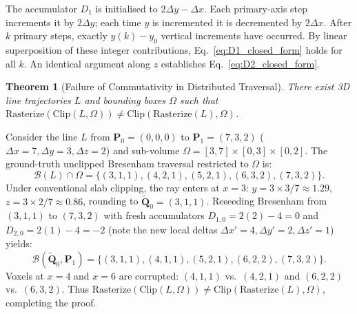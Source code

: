 \documentclass[conference]{IEEEtran}
\newtheorem{theorem}{Theorem}
\begin{document}
\begin{IEEEproof}
The accumulator $D_1$ is initialised to $2\Delta y - \Delta x$. Each primary-axis step increments it by $2\Delta y$; each time $y$ is incremented it is decremented by $2\Delta x$. After $k$ primary steps, exactly $y(k) - y_0$ vertical increments have occurred. By linear superposition of these integer contributions, Eq.~\eqref{eq:D1_closed_form} holds for all $k$. An identical argument along $z$ establishes Eq.~\eqref{eq:D2_closed_form}.
\end{IEEEproof}

\begin{theorem}[Failure of Commutativity in Distributed Traversal]
\label{thm:counterexample}
There exist 3D line trajectories $L$ and bounding boxes $\Omega$ such that $\mathrm{Rasterize}(\mathrm{Clip}(L, \Omega)) \ne \mathrm{Clip}(\mathrm{Rasterize}(L), \Omega)$.
\end{theorem}

\begin{IEEEproof}
Consider the line $L$ from $\mathbf{P}_0 = (0,0,0)$ to $\mathbf{P}_1 = (7,3,2)$ ($\Delta x = 7, \Delta y = 3, \Delta z = 2$) and sub-volume $\Omega = [3, 7] \times [0, 3] \times [0, 2]$.
The ground-truth unclipped Bresenham traversal restricted to $\Omega$ is:
$$\mathcal{B}(L) \cap \Omega = \{(3, 1, 1), (4, 2, 1), (5, 2, 1), (6, 3, 2), (7, 3, 2)\}.$$
Under conventional slab clipping, the ray enters at $x = 3$: $y = 3 \times 3/7 \approx 1.29$, $z = 3 \times 2/7 \approx 0.86$, rounding to $\tilde{\mathbf{Q}}_0 = (3, 1, 1)$. Reseeding Bresenham from $(3, 1, 1)$ to $(7, 3, 2)$ with fresh accumulators $D_{1,0} = 2(2) - 4 = 0$ and $D_{2,0} = 2(1) - 4 = -2$ (note the new local deltas $\Delta x' = 4, \Delta y' = 2, \Delta z' = 1$) yields:
$$\mathcal{B}(\tilde{\mathbf{Q}}_0, \mathbf{P}_1) = \{(3, 1, 1), (4, 1, 1), (5, 2, 1), (6, 2, 2), (7, 3, 2)\}.$$
Voxels at $x = 4$ and $x = 6$ are corrupted: $(4, 1, 1)$ vs.\ $(4, 2, 1)$ and $(6, 2, 2)$ vs.\ $(6, 3, 2)$. Thus $\mathrm{Rasterize}(\mathrm{Clip}(L, \Omega)) \ne \mathrm{Clip}(\mathrm{Rasterize}(L), \Omega)$, completing the proof.
\end{IEEEproof}
\end{document}

